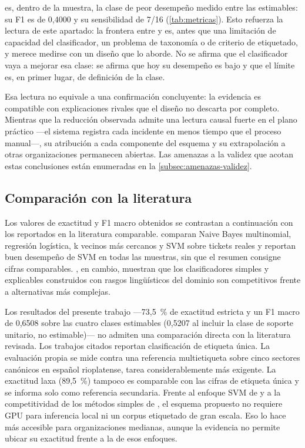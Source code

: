  es, dentro de la muestra, la clase de peor desempeño medido entre las estimables: su F1 es de 0,4000 y su sensibilidad de 7/16 (\autoref{tab:metricas}). Esto refuerza la lectura de este apartado: la frontera entre  y  es, antes que una limitación de capacidad del clasificador, un problema de taxonomía o de criterio de etiquetado, y merece medirse con un diseño que lo aborde. No se afirma que el clasificador vaya a mejorar esa clase: se afirma que hoy su desempeño es bajo y que el límite es, en primer lugar, de definición de la clase.

Esa lectura no equivale a una confirmación concluyente: la evidencia es compatible con explicaciones rivales que el diseño no descarta por completo. Mientras que la reducción observada admite una lectura causal fuerte en el plano práctico ---el sistema registra cada incidente en menos tiempo que el proceso manual---, su atribución a cada componente del esquema y su extrapolación a otras organizaciones permanecen abiertas. Las amenazas a la validez que acotan estas conclusiones están enumeradas en la \autoref{subsec:amenazas-validez}.

\subsection{Comparación con la literatura}\label{subsec:comparacion-literatura}

Los valores de exactitud y F1 macro obtenidos se contrastan a continuación con los reportados en la literatura comparable. \textcite{Paramesh2019_it_service_desk} comparan Naive Bayes multinomial, regresión logística, k vecinos más cercanos y SVM sobre tickets reales y reportan buen desempeño de SVM en todas las muestras, sin que el resumen consigne cifras comparables. \textcite{Revina2020_it_tickets}, en cambio, muestran que los clasificadores simples y explicables construidos con rasgos lingüísticos del dominio son competitivos frente a alternativas más complejas.

Los resultados del presente trabajo ---73,5~\% de exactitud estricta y un F1 macro de 0,6508 sobre las cuatro clases estimables (0,5207 al incluir la clase de soporte unitario, no estimable)--- no admiten una comparación directa con la literatura revisada. Los trabajos citados reportan clasificación de etiqueta única. La evaluación propia se mide contra una referencia multietiqueta sobre cinco sectores canónicos en español rioplatense, tarea considerablemente más exigente. La exactitud laxa (89,5~\%) tampoco es comparable con las cifras de etiqueta única y se informa solo como referencia secundaria. Frente al enfoque SVM de \textcite{Paramesh2019_it_service_desk} y a la competitividad de los métodos simples de \textcite{Revina2020_it_tickets}, el esquema propuesto no requiere GPU para inferencia local ni un corpus etiquetado de gran escala. Eso lo hace más accesible para organizaciones medianas, aunque la evidencia no permite ubicar su exactitud frente a la de esos enfoques.

